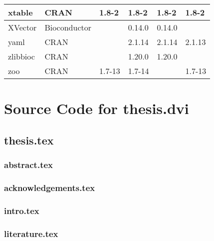 \begin{longtable}{|llllll|}
xtable                        & CRAN                      & 1.8-2       & 1.8-2       & 1.8-2          & 1.8-2            \\ \hline
XVector                       & Bioconductor              &             & 0.14.0      & 0.14.0         &                   \\ \hline \rowcolor{gray!25}
yaml                          & CRAN                      &             & 2.1.14      & 2.1.14         & 2.1.13           \\ \hline
zlibbioc                      & CRAN                      &             & 1.20.0      & 1.20.0         &                   \\ \hline \rowcolor{gray!25}
zoo                           & CRAN                      & 1.7-13      & 1.7-14      &                & 1.7-13           \\ \hline
\end{longtable}

\iffalse

\chapter{Source Code for thesis.dvi}

\linespread{1}
\footnotesize

\section{thesis.tex}

\subsection{abstract.tex}

\subsection{acknowledgements.tex}

\subsection{intro.tex}

\subsection{literature.tex}

